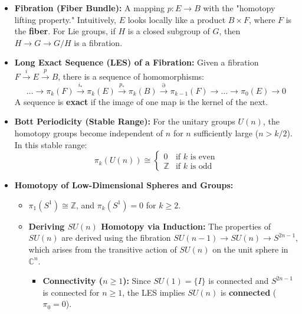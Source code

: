\begin{solution}
\begin{itemize}
\begin{itemize}
\begin{itemize}
        \end{itemize}
    \end{itemize}
    \item \textbf{Fibration (Fiber Bundle):} A mapping $p: E \to B$ with the "homotopy lifting property." Intuitively, $E$ looks locally like a product $B \times F$, where $F$ is the \textbf{fiber}. For Lie groups, if $H$ is a closed subgroup of $G$, then $H \to G \to G/H$ is a fibration.
    \item \textbf{Long Exact Sequence (LES) of a Fibration:} Given a fibration $F \xrightarrow{i} E \xrightarrow{p} B$, there is a sequence of homomorphisms:
    \[ \dots \to \pi_k(F) \xrightarrow{i_*} \pi_k(E) \xrightarrow{p_*} \pi_k(B) \xrightarrow{\partial} \pi_{k-1}(F) \to \dots \to \pi_0(E) \to 0 \]
    A sequence is \textbf{exact} if the image of one map is the kernel of the next.
    \item \textbf{Bott Periodicity (Stable Range):} For the unitary groups $U(n)$, the homotopy groups become independent of $n$ for $n$ sufficiently large ($n > k/2$). In this stable range:
    \[ \pi_k(U(n)) \cong \begin{cases} 0 & \text{if } k \text{ is even} \\ \mathbb{Z} & \text{if } k \text{ is odd} \end{cases} \]
    \item \textbf{Homotopy of Low-Dimensional Spheres and Groups:}
    \begin{itemize}
        \item $\pi_1(S^1) \cong \mathbb{Z}$, and $\pi_k(S^1) = 0$ for $k \geq 2$.
        \item \textbf{Deriving $SU(n)$ Homotopy via Induction:} The properties of $SU(n)$ are derived using the fibration $SU(n-1) \to SU(n) \to S^{2n-1}$, which arises from the transitive action of $SU(n)$ on the unit sphere in $\mathbb{C}^n$.
        \begin{itemize}
            \item \textbf{Connectivity ($n \geq 1$):} Since $SU(1) = \{I\}$ is connected and $S^{2n-1}$ is connected for $n \geq 1$, the LES implies $SU(n)$ is \textbf{connected} ($\pi_0 = 0$).

\end{itemize}
\end{itemize}
\end{itemize}
\end{solution}
